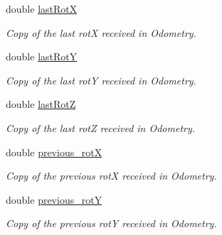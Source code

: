 \begin{DoxyCompactItemize}
\mbox{\label{classPoseEstimator_a855a33d2b02cb2206f9ef81ce37e89d7}} 
double \hyperlink{classPoseEstimator_a855a33d2b02cb2206f9ef81ce37e89d7}{last\+RotX}
\begin{DoxyCompactList}\small\item\em Copy of the last rotX received in Odometry. \end{DoxyCompactList}\item 
\mbox{\label{classPoseEstimator_a1f34203f6b6f47bac3a8d4fe49c5bcf2}} 
double \hyperlink{classPoseEstimator_a1f34203f6b6f47bac3a8d4fe49c5bcf2}{last\+RotY}
\begin{DoxyCompactList}\small\item\em Copy of the last rotY received in Odometry. \end{DoxyCompactList}\item 
\mbox{\label{classPoseEstimator_aa73d51ce96778db91ec0381e320fd79a}} 
double \hyperlink{classPoseEstimator_aa73d51ce96778db91ec0381e320fd79a}{last\+RotZ}
\begin{DoxyCompactList}\small\item\em Copy of the last rotZ received in Odometry. \end{DoxyCompactList}\item 
\mbox{\label{classPoseEstimator_a363e82d379f09e271a792aab8716b721}} 
double \hyperlink{classPoseEstimator_a363e82d379f09e271a792aab8716b721}{previous\+\_\+rotX}
\begin{DoxyCompactList}\small\item\em Copy of the previous rotX received in Odometry. \end{DoxyCompactList}\item 
\mbox{\label{classPoseEstimator_adef29793b0babf65bfd54edff4f54d0f}} 
double \hyperlink{classPoseEstimator_adef29793b0babf65bfd54edff4f54d0f}{previous\+\_\+rotY}
\begin{DoxyCompactList}\small\item\em Copy of the previous rotY received in Odometry. \end{DoxyCompactList}\item 
\mbox{\label{classPoseEstimator_a9f7fd73224b194ae6a79d11d4d423a1c}} 

\end{DoxyCompactItemize}
